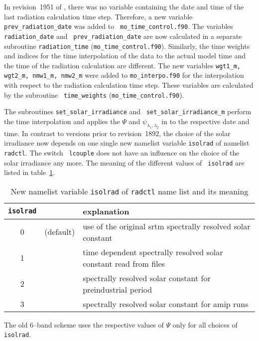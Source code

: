 \begin{appendix}
In revision~1951 of \echam, there was no variable containing the date and
time of the last radiation calculation time step. Therefore, a new
variable {\tt prev\_radiation\_date} was added to {\tt
  mo\_time\_control.f90}. The variables {\tt radiation\_date} and {\tt
  prev\_radiation\_date} are now calculated in a separate subroutine
{\tt radiation\_time} ({\tt mo\_time\_control.f90}).
Similarly, the time weights and indices for the time interpolation of
the data to the actual model time and the time of the radiation
calculation are different. The new variables {\tt wgt1\_m, wgt2\_m,
  nmw1\_m, nmw2\_m} were added to {\tt mo\_interpo.f90} for the
interpolation with respect to the radiation calculation time
step. These variables are calculated by the subroutine {\tt
  time\_weights} ({\tt mo\_time\_control.f90}). 

The subroutines {\tt set\_solar\_irradiance} and {\tt
  set\_solar\_irradiance\_m} 
perform the time interpolation and applies the $\Psi$ and
$\psi_{\lambda_1,\lambda_2}$ in \echam{} to the respective date and time.
In contrast to \echam{} versions prior to revision~1892, the choice of
the solar irradiance now depends on one single new namelist
variable {\tt isolrad} of namelist {\tt radctl}. The switch {\tt
  lcouple} does not have an influence on the choice of the solar
irradiance any more. The meaning of the different values of {\tt
  isolrad} are listed in table~\ref{tab_isolrad}.

\begin{table}
\caption{New namelist variable {\tt isolrad} of {\tt radctl} name list
  and its meaning}\label{tab_isolrad}
\begin{tabular*}{\textwidth}{c@{\extracolsep\fill}cp{14cm}}\hline
{\tt isolrad} && explanation \\\hline
0 &(default) & use of the original srtm spectrally resolved
                       solar constant \\
1 &          & time dependent spectrally resolved solar 
                       constant read from files \\
2 &          & spectrally resolved solar constant for preindustrial period\\
3 &          & spectrally resolved solar constant for amip runs \\\hline
\end{tabular*}
\end{table}

The old 6--band scheme uses the respective values of $\Psi$ only for
all choices of {\tt isolrad}.


\end{appendix}
